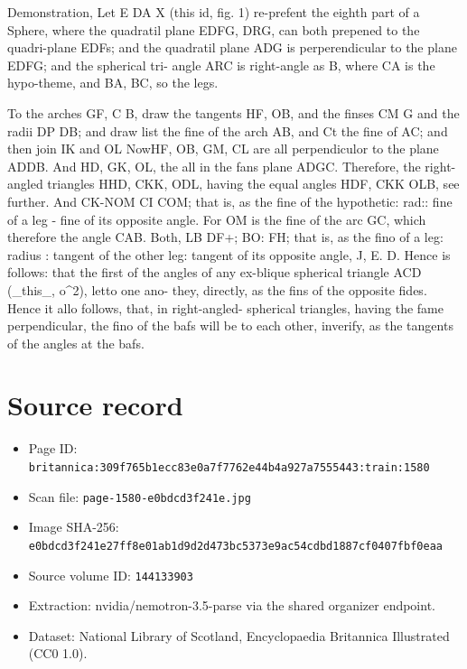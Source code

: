\documentclass{article}
\begin{document}
Demonstration, Let E DA X (this id, fig. 1) re-prefent the eighth part of a Sphere, where the quadratil plane EDFG, DRG, can both prepened to the quadri-plane EDFs; and the quadratil plane ADG is perperendicular to the plane EDFG; and the spherical tri- angle ARC is right-angle as B, where CA is the hypo-theme, and BA, BC, so the legs.

To the arches GF, C B, draw the tangents HF, OB, and the finses CM G and the radii DP DB; and draw list the fine of the arch AB, and Ct the fine of AC; and then join IK and OL NowHF, OB, GM, CL are all perpendiculor to the plane ADDB. And HD, GK, OL, the all in the fans plane ADGC. Therefore, the right-angled triangles HHD, CKK, ODL, having the equal angles HDF, CKK OLB, see further. And CK-NOM CI COM; that is, as the fine of the hypothetic: rad:: fine of a leg - fine of its opposite angle. For OM is the fine of the arc GC, which therefore the angle CAB. Both, LB DF+; BO: FH; that is, as the fino of a leg: radius : tangent of the other leg: tangent of its opposite angle, J, E. D. Hence is follows: that the first of the angles of any ex-blique spherical triangle ACD (\_this\_, o\textasciicircum{}2), letto one ano- they, directly, as the fins of the opposite fides. Hence it allo follows, that, in right-angled- spherical triangles, having the fame perpendicular, the fino of the bafs will be to each other, inverify, as the tangents of the angles at the bafs.

\section*{Source record}
\begin{itemize}
\item Page ID: \texttt{britannica:309f765b1ecc83e0a7f7762e44b4a927a7555443:train:1580}
\item Scan file: \texttt{page-1580-e0bdcd3f241e.jpg}
\item Image SHA-256: \texttt{e0bdcd3f241e27ff8e01ab1d9d2d473bc5373e9ac54cdbd1887cf0407fbf0eaa}
\item Source volume ID: \texttt{144133903}
\item Extraction: nvidia/nemotron-3.5-parse via the shared organizer endpoint.
\item Dataset: National Library of Scotland, Encyclopaedia Britannica Illustrated (CC0 1.0).
\end{itemize}
\end{document}
